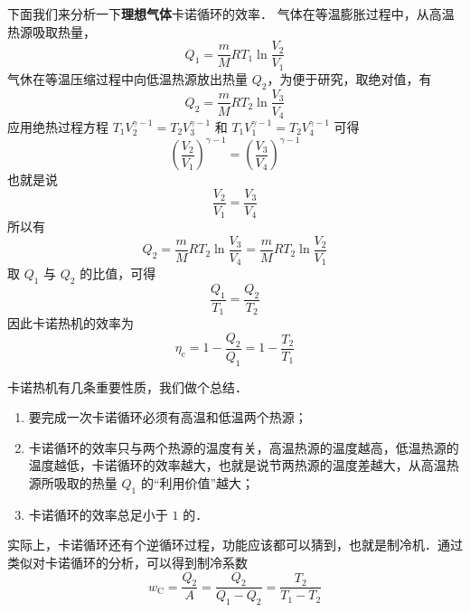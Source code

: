 下面我们来分析一下\textbf{理想气体}卡诺循环的效率． 气体在等温膨胀过程中，从高温热源吸取热量，
\begin{equation}\label{Carnot_eq1}
Q_{1}=\frac{m}{M} R T_{1} \ln \frac{V_{2}}{V_{1}}
\end{equation}
气休在等温压缩过程中向低温热源放出热量 $Q_2$，为便于研究，取绝对值，有
\begin{equation}\label{Carnot_eq2}
Q_{2}=\frac{m}{M} R T_{2} \ln \frac{V_{3}}{V_{4}}
\end{equation}
应用绝热过程方程 $T_{1} V_{2}^{\gamma-1}=T_{2} V_{3}^{\gamma-1}$ 和 $T_{1} V_{1}^{\gamma-1}=T_{2} V_{4}^{\gamma-1}$ 可得
\begin{equation}
\left(\frac{V_{2}}{V_{1}}\right)^{\gamma-1}=\left(\frac{V_{3}}{V_{4}}\right)^{\gamma-1}
\end{equation}
也就是说
\begin{equation}\label{Carnot_eq3}
\frac{V_{2}}{V_{1}}=\frac{V_{3}}{V_{4}}
\end{equation}
所以有
\begin{equation}
Q_{2}=\frac{m}{M} R T_{2} \ln \frac{V_{3}}{V_{4}}=\frac{m}{M} R T_{2} \ln \frac{V_{2}}{V_{1}}
\end{equation}
取 $Q_1$ 与 $Q_2$ 的比值，可得
\begin{equation}\label{Carnot_eq4}
\frac{Q_{1}}{T_{1}}=\frac{Q_{2}}{T_{2}}
\end{equation}
因此卡诺热机的效率为
\begin{equation}
\eta_{\mathrm{c}}=1-\frac{Q_{2}}{Q_{1}}=1-\frac{T_{2}}{T_{1}}
\end{equation}

卡诺热机有几条重要性质，我们做个总结．

\begin{enumerate}
\item 要完成一次卡诺循环必须有高温和低温两个热源；
\item 卡诺循环的效率只与两个热源的温度有关，高温热源的温度越高，低温热源的温度越低，卡诺循环的效率越大，也就是说节两热源的温度差越大，从高温热源所吸取的热量 $Q_1$ 的“利用价值”越大；
\item 卡诺循环的效率总足小于 $1 $ 的．
\end{enumerate}

实际上，卡诺循环还有个逆循环过程，功能应该都可以猜到，也就是制冷机．通过类似对卡诺循环的分析，可以得到制冷系数
\begin{equation}
w_{\mathrm{C}}=\frac{Q_{2}}{A}=\frac{Q_{2}}{Q_{1}-Q_{2}}=\frac{T_{2}}{T_{1}-T_{2}}
\end{equation}


